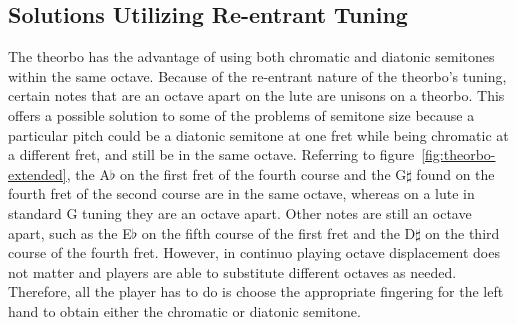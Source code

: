 \subsection{Solutions Utilizing Re-entrant Tuning}

The theorbo has the advantage of using both chromatic and diatonic semitones
within the same octave.  Because of the re-entrant nature of the theorbo's
tuning, certain notes  that are an octave apart on the lute are unisons on a
theorbo. This offers a possible solution to some of the problems of semitone
size because a particular pitch could be a diatonic semitone at one fret while
being chromatic at a different fret, and still be in the same octave. Referring
to figure~\ref{fig:theorbo-extended}, the A$\flat$ on the first fret of the
fourth course and the G$\sharp$ found on the fourth fret of the second course
are in the same octave, whereas on a lute in standard G tuning they are an
octave apart. Other notes are still an octave apart, such as the E$\flat$ on the
fifth course of the first fret and the D$\sharp$ on the third course of the
fourth fret.  However, in continuo playing octave displacement does not matter
and players are able to substitute different octaves as needed. Therefore, all
the player has to do is choose the appropriate fingering for the left hand to
obtain either the chromatic or diatonic semitone.

